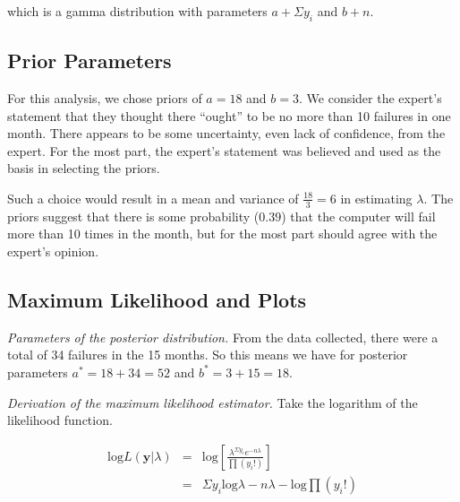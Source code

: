 \documentclass[12pt]{article}
\begin{document}
\noindent which is a gamma distribution with parameters $a+\Sigma y_i$ and $b+n$.  %

\subsection{Prior Parameters}

\noindent For this analysis, we chose priors of $a=18$ and $b=3$.  We consider the expert's statement that they thought there ``ought'' to be no more than 10 failures in one month.  There appears to be some uncertainty, even lack of confidence, from the expert.  For the most part, the expert's statement was believed and used as the basis in selecting the priors.
\bigskip

\noindent Such a choice would result in a mean and variance of $\frac{18}{3}=6$ in estimating $\lambda$.  The priors suggest that there is some probability ($0.39$) that the computer will fail more than 10 times in the month, but for the most part should agree with the expert's opinion.

\subsection{Maximum Likelihood and Plots}

%

\noindent \textit{Parameters of the posterior distribution.}  From the data collected, there were a total of 34 failures in the 15 months.  So this means we have for posterior parameters $a^*=18+34=52$ and $b^*=3+15=18$.
\bigskip

\noindent \textit{Derivation of the maximum likelihood estimator.}  Take the logarithm of the likelihood function.

\begin{eqnarray*}
\mathrm{log}L(\mathbf{y}|\lambda) &=& \mathrm{log}\left[\frac{\lambda^{\Sigma y_i}e^{-n\lambda}}{\prod (y_i!)}\right] \\
&=& \Sigma y_i\mathrm{log}\lambda-n\lambda-\mathrm{log}\prod (y_i!) \\
\end{eqnarray*}
\end{document}
